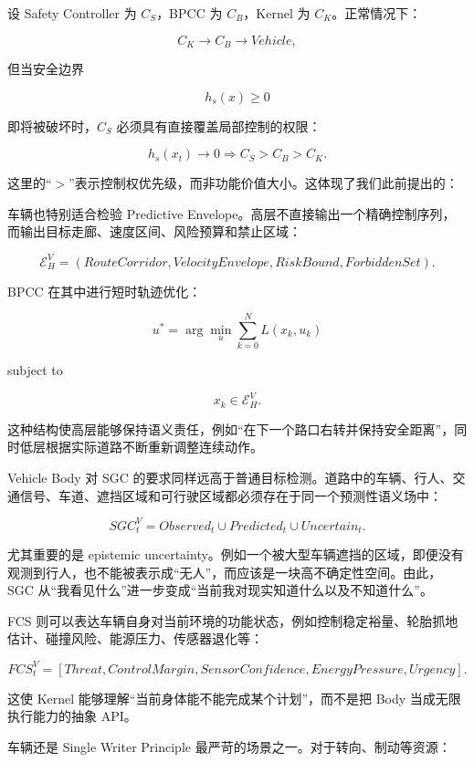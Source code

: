 设 Safety Controller 为 $C_S$，BPCC 为 $C_B$，Kernel 为 $C_K$。正常情况下：

$$
C_K\rightarrow C_B\rightarrow Vehicle,
$$

但当安全边界

$$
h_s(x)\geq0
$$

即将被破坏时，$C_S$ 必须具有直接覆盖局部控制的权限：

$$
h_s(x_t)\rightarrow0
\Rightarrow
C_S>C_B>C_K.
$$

这里的“$>$”表示控制权优先级，而非功能价值大小。这体现了我们此前提出的：

\begin{statementbox}
\centering
{}
\end{statementbox}

车辆也特别适合检验 Predictive Envelope。高层不直接输出一个精确控制序列，而输出目标走廊、速度区间、风险预算和禁止区域：

$$
\mathcal E_H^V
=
(
RouteCorridor,
VelocityEnvelope,
RiskBound,
ForbiddenSet
).
$$

BPCC 在其中进行短时轨迹优化：

$$
u^{*}
=
\arg\min_u
\sum_{k=0}^{N}
L(x_k,u_k)
$$

subject to

$$
x_k\in\mathcal E_H^V.
$$

这种结构使高层能够保持语义责任，例如“在下一个路口右转并保持安全距离”，同时低层根据实际道路不断重新调整连续动作。

Vehicle Body 对 SGC 的要求同样远高于普通目标检测。道路中的车辆、行人、交通信号、车道、遮挡区域和可行驶区域都必须存在于同一个预测性语义场中：

$$
SGC_t^V
=
Observed_t
\cup
Predicted_t
\cup
Uncertain_t.
$$

尤其重要的是 epistemic uncertainty。例如一个被大型车辆遮挡的区域，即便没有观测到行人，也不能被表示成“无人”，而应该是一块高不确定性空间。由此，SGC 从“我看见什么”进一步变成“当前我对现实知道什么以及不知道什么”。

FCS 则可以表达车辆自身对当前环境的功能状态，例如控制稳定裕量、轮胎抓地估计、碰撞风险、能源压力、传感器退化等：

$$
FCS_t^V
=
[
Threat,
ControlMargin,
SensorConfidence,
EnergyPressure,
Urgency
].
$$

这使 Kernel 能够理解“当前身体能不能完成某个计划”，而不是把 Body 当成无限执行能力的抽象 API。

车辆还是 Single Writer Principle 最严苛的场景之一。对于转向、制动等资源：

